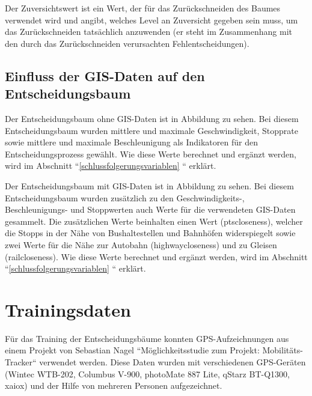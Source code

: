Der Zuversichtswert ist ein Wert, der für das Zurückschneiden des Baumes verwendet wird und angibt, welches Level an Zuversicht gegeben sein muss, um das Zurückschneiden tatsächlich anzuwenden (er steht im Zusammenhang mit den durch das Zurückschneiden verursachten Fehlentscheidungen). \cite{rapidminer_rapidminer_2015}


\subsection{Einfluss der GIS-Daten auf den Entscheidungsbaum}
\label{entscheidungsbaum}
Der Entscheidungsbaum ohne GIS-Daten ist in Abbildung  zu sehen. Bei diesem Entscheidungsbaum wurden mittlere und maximale Geschwindigkeit, Stopprate sowie mittlere und maximale Beschleunigung als Indikatoren für den Entscheidungsprozess gewählt. Wie diese Werte berechnet und ergänzt werden, wird im Abschnitt ``\ref {schlussfolgerungsvariablen}  `` erklärt. 

\label{entscheidungsbaumGIS}
Der Entscheidungsbaum mit GIS-Daten ist in Abbildung  zu sehen. Bei diesem Entscheidungsbaum wurden zusätzlich zu den Geschwindigkeits-, Beschleunigungs- und Stoppwerten auch Werte für die verwendeten GIS-Daten gesammelt. Die zusätzlichen Werte beinhalten einen Wert (ptscloseness), welcher die Stopps in der Nähe von Bushaltestellen und Bahnhöfen widerspiegelt sowie zwei Werte für die Nähe zur Autobahn (highwaycloseness) und zu Gleisen (railcloseness). Wie diese Werte berechnet und ergänzt werden, wird im Abschnitt ``\ref{schlussfolgerungsvariablen} `` erklärt.

\clearpage

\clearpage

\section{Trainingsdaten}
\label{sec:trainingdata}
Für das Training der Entscheidungsbäume konnten GPS-Aufzeichnungen aus einem Projekt von Sebastian Nagel ``Möglichkeitsstudie zum Projekt: Mobilitäts-Tracker`` verwendet werden. Diese Daten wurden mit verschiedenen GPS-Geräten (Wintec WTB-202, Columbus V-900, photoMate 887 Lite, qStarz BT-Q1300, xaiox) und der Hilfe von mehreren Personen aufgezeichnet. \cite{sebastian_nagel_moglichkeitsstudie_2011}


